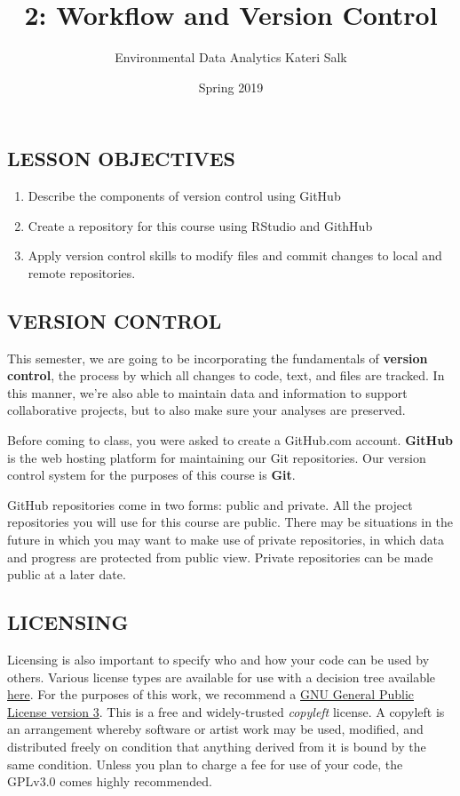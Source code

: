 \documentclass[]{article}
\title{2: Workflow and Version Control}
\author{Environmental Data Analytics \textbar{} Kateri Salk}
\date{Spring 2019}
\providecommand{\tightlist}{%
  \setlength{\itemsep}{0pt}\setlength{\parskip}{0pt}}
\begin{document}
\maketitle

\subsection{LESSON OBJECTIVES}\label{lesson-objectives}

\begin{enumerate}
\def\labelenumi{\arabic{enumi}.}
\tightlist
\item
  Describe the components of version control using GitHub
\item
  Create a repository for this course using RStudio and GithHub
\item
  Apply version control skills to modify files and commit changes to
  local and remote repositories.
\end{enumerate}

\subsection{VERSION CONTROL}\label{version-control}

This semester, we are going to be incorporating the fundamentals of
\textbf{version control}, the process by which all changes to code,
text, and files are tracked. In this manner, we're also able to maintain
data and information to support collaborative projects, but to also make
sure your analyses are preserved.

Before coming to class, you were asked to create a GitHub.com account.
\textbf{GitHub} is the web hosting platform for maintaining our Git
repositories. Our version control system for the purposes of this course
is \textbf{Git}.

GitHub repositories come in two forms: public and private. All the
project repositories you will use for this course are public. There may
be situations in the future in which you may want to make use of private
repositories, in which data and progress are protected from public view.
Private repositories can be made public at a later date.

\subsection{LICENSING}\label{licensing}

Licensing is also important to specify who and how your code can be used
by others. Various license types are available for use with a decision
tree available \href{https://choosealicense.com/}{here}. For the
purposes of this work, we recommend a
\href{https://choosealicense.com/licenses/gpl-3.0/}{GNU General Public
License version 3}. This is a free and widely-trusted \emph{copyleft}
license. A copyleft is an arrangement whereby software or artist work
may be used, modified, and distributed freely on condition that anything
derived from it is bound by the same condition. Unless you plan to
charge a fee for use of your code, the GPLv3.0 comes highly recommended.
\end{document}
